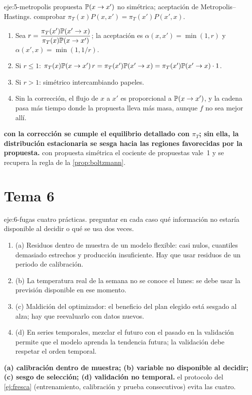 \begin{solucion}{eje:5-metropolis}
\datos propuesta $\mathbb{P}(x\to x')$ no simétrica; aceptación de Metropolis--Hastings.
\planteamiento comprobar $\pi_T(x)P(x,x')=\pi_T(x')P(x',x)$.
\pasos
\begin{enumerate}[label=\arabic*.]
  \item Sea $r=\dfrac{\pi_T(x')\mathbb{P}(x'\to x)}{\pi_T(x)\mathbb{P}(x\to x')}$; la aceptación es $\alpha(x,x')=\min(1,r)$ y $\alpha(x',x)=\min(1,1/r)$.
  \item Si $r\le 1$: $\pi_T(x)\mathbb{P}(x\to x')\,r=\pi_T(x')\mathbb{P}(x'\to x)=\pi_T(x')\mathbb{P}(x'\to x)\cdot 1$.
  \item Si $r>1$: simétrico intercambiando papeles.
  \item Sin la corrección, el flujo de $x$ a $x'$ es proporcional a $\mathbb{P}(x\to x')$, y la cadena pasa más tiempo donde la propuesta lleva más masa, aunque $f$ no sea mejor allí.
\end{enumerate}
\resultado \textbf{con la corrección se cumple el equilibrio detallado con $\pi_T$; sin ella, la distribución estacionaria se sesga hacia las regiones favorecidas por la propuesta.}
\comprobacion con propuesta simétrica el cociente de propuestas vale~1 y se recupera la regla de la \cref{prop:boltzmann}.
\end{solucion}

\section{Tema 6}

\begin{solucion}{eje:6-fugas}
\datos cuatro prácticas.
\planteamiento preguntar en cada caso qué información no estaría disponible al decidir o qué se usa dos veces.
\pasos
\begin{enumerate}[label=\arabic*.]
  \item (a) Residuos dentro de muestra de un modelo flexible: casi nulos, cuantiles demasiado estrechos y producción insuficiente. Hay que usar residuos de un periodo de calibración.
  \item (b) La temperatura real de la semana no se conoce el lunes: se debe usar la previsión disponible en ese momento.
  \item (c) Maldición del optimizador: el beneficio del plan elegido está sesgado al alza; hay que reevaluarlo con datos nuevos.
  \item (d) En series temporales, mezclar el futuro con el pasado en la validación permite que el modelo aprenda la tendencia futura; la validación debe respetar el orden temporal.
\end{enumerate}
\resultado \textbf{(a) calibración dentro de muestra; (b) variable no disponible al decidir; (c) sesgo de selección; (d) validación no temporal.}
\comprobacion el protocolo del \cref{ej:fresca} (entrenamiento, calibración y prueba consecutivos) evita las cuatro.
\end{solucion}

